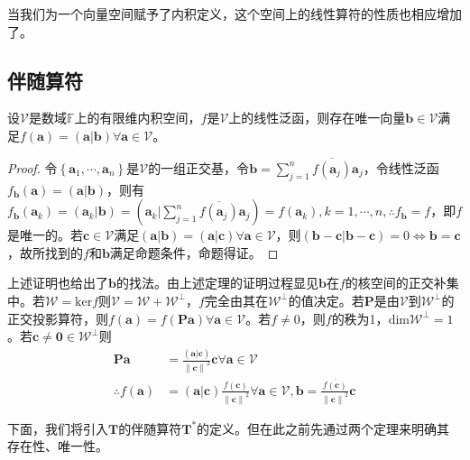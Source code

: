 \documentclass[main.tex]{subfiles}
\begin{document}
当我们为一个向量空间赋予了内积定义，这个空间上的线性算符的性质也相应增加了。

\subsection{伴随算符}
\begin{theorem}
设$\mathcal{V}$是数域$\mathbb{F}$上的有限维内积空间，$f$是$\mathcal{V}$上的线性泛函，则存在唯一向量$\mathbf{b}\in\mathcal{V}$满足$f\left(\mathbf{a}\right)=\left(\mathbf{a}|\mathbf{b}\right)\forall\mathbf{a}\in\mathcal{V}$。
\end{theorem}
\begin{proof}
令$\left\{\mathbf{a}_1,\cdots,\mathbf{a}_n\right\}$是$\mathcal{V}$的一组正交基，令$\mathbf{b}=\sum_{j=1}^n\overline{f\left(\mathbf{a}_j\right)}\mathbf{a}_j$，令线性泛函$f_\mathbf{b}\left(\mathbf{a}\right)=\left(\mathbf{a}|\mathbf{b}\right)$，则有$f_\mathbf{b}\left(\mathbf{a}_k\right)=\left(\mathbf{a}_k|\mathbf{b}\right)=\left(\mathbf{a}_k|\sum_{j=1}^n\overline{f\left(\mathbf{a}_j\right)}\mathbf{a}_j\right)=f\left(\mathbf{a}_k\right),k=1,\cdots,n,\therefore f_\mathbf{b}=f$，即$f$是唯一的。若$\mathbf{c}\in\mathcal{V}$满足$\left(\mathbf{a}|\mathbf{b}\right)=\left(\mathbf{a}|\mathbf{c}\right)\forall \mathbf{a}\in\mathcal{V}$，则$\left(\mathbf{b}-\mathbf{c}|\mathbf{b}-\mathbf{c}\right)=0\Leftrightarrow\mathbf{b}=\mathbf{c}$，故所找到的$f$和$\mathbf{b}$满足命题条件，命题得证。
\end{proof}
上述证明也给出了$\mathbf{b}$的找法。由上述定理的证明过程显见$\mathbf{b}$在$f$的核空间的正交补集中。若$\mathcal{W}=\mathrm{ker}f$则$\mathcal{V}=\mathcal{W}+\mathcal{W}^\perp$，$f$完全由其在$\mathcal{W}^\perp$的值决定。若$\mathbf{P}$是由$\mathcal{V}$到$\mathcal{W}^\perp$的正交投影算符，则$f\left(\mathbf{a}\right)=f\left(\mathbf{Pa}\right)\forall\mathbf{a}\in\mathcal{V}$。若$f\neq 0$，则$f$的秩为1，$\mathrm{dim}\mathcal{W}^\perp=1$。若$\mathbf{c}\neq\mathbf{0}\in\mathcal{W}^\perp$则
\begin{align*}\mathbf{Pa}&=\frac{\left(\mathbf{a}|\mathbf{c}\right)}{\left\|\mathbf{c}\right\|^2}\mathbf{c}\forall\mathbf{a}\in\mathcal{V}\\
\therefore f\left(\mathbf{a}\right)&=\left(\mathbf{a}|\mathbf{c}\right)\frac{f\left(\mathbf{c}\right)}{\left\|\mathbf{c}\right\|^2}\forall\mathbf{a}\in\mathcal{V},\mathbf{b}=\frac{\overline{f\left(\mathbf{c}\right)}}{\left\|\mathbf{c}\right\|^2}\mathbf{c}
\end{align*}

下面，我们将引入$\mathbf{T}$的伴随算符$\mathbf{T}^*$的定义。但在此之前先通过两个定理来明确其存在性、唯一性。
\end{document}
